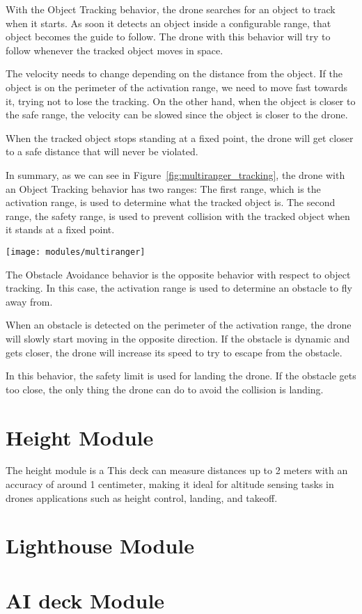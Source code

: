 With the Object Tracking behavior, the drone searches for an object to track when it starts. 
As soon it detects an object inside a configurable range, that object becomes the guide to follow. 
The drone with this behavior will try to follow whenever the tracked object moves in space. 

The velocity needs to change depending on the distance from the object. 
If the object is on the perimeter of the activation range, we need to move fast towards it, trying not to lose the tracking. 
On the other hand, when the object is closer to the safe range, the velocity can be slowed since the object is closer to the drone.

When the tracked object stops standing at a fixed point, the drone will get closer to a safe distance that will never be violated.

In summary, as we can see in Figure~\ref{fig:multiranger_tracking}, the drone with an Object Tracking behavior has two ranges:
The first range, which is the activation range, is used to determine what the tracked object is.
The second range, the safety range, is used to prevent collision with the tracked object when it stands at a fixed point.

\begin{SCfigure}[\sidecaptionrelwidth][h]
    \texttt{[image: modules/multiranger]}
    \caption{Multiranger Object Tracking behavior}\label{fig:multiranger_tracking}
\end{SCfigure}

The Obstacle Avoidance behavior is the opposite behavior with respect to object tracking. 
In this case, the activation range is used to determine an obstacle to fly away from.

When an obstacle is detected on the perimeter of the activation range, the drone will slowly start moving in the opposite direction. 
If the obstacle is dynamic and gets closer, the drone will increase its speed to try to escape from the obstacle.

In this behavior, the safety limit is used for landing the drone. 
If the obstacle gets too close, the only thing the drone can do to avoid the collision is landing.

\section{Height Module}\label{sec:module_height}

The height module is a 
This deck can measure distances up to 2 meters with an accuracy of around 1 centimeter, making it ideal for altitude sensing tasks in drones applications such as height control, landing, and takeoff.

\section{Lighthouse Module}\label{sec:module_lighthouse}



\section{AI deck Module}\label{sec:module_ai_deck}
